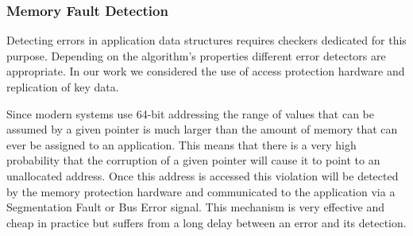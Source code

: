 \documentclass{sig-alternate}
\newcommand{\greg}[1]{%
  \textcolor{blue}{GB: #1}
}
\begin{document}



\subsubsection{Memory Fault Detection}
\label{sec:res_tech:err_det:mem}

Detecting errors in application data structures requires checkers dedicated for this purpose.
Depending on the algorithm's properties different error detectors are appropriate.
In our work we considered the use of access protection hardware and replication of key data.

Since modern systems use 64-bit addressing the range of values that can be assumed by a given pointer is much larger than the amount of memory that can ever be assigned to an application.
This means that there is a very high probability that the corruption of a given pointer will cause it to point to an unallocated address.
Once this address is accessed this violation will be detected by the memory protection hardware and communicated to the application via a Segmentation Fault or Bus Error signal.
This mechanism is very effective and cheap in practice but suffers from a long delay between an error and its detection.
\end{document}
